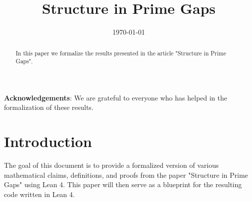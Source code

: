 %


%

\title{Structure in Prime Gaps}

\date{\today}

\begin{abstract}
In this paper we formalize the results presented in the article "Structure in Prime Gaps".
\end{abstract}

\maketitle

\tableofcontents

\textbf{Acknowledgements}: We are grateful to everyone who has helped in the formalization of these results. 

\section{Introduction}
The goal of this document is to provide a formalized version of various mathematical claims, definitions, and proofs from the paper "Structure in Prime Gaps" using Lean 4. This paper will then serve as a blueprint for the resulting code written in Lean 4.

